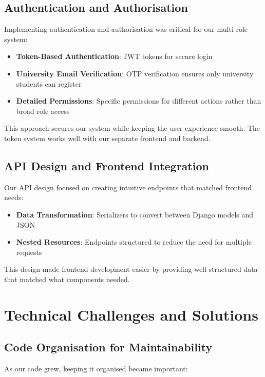 \subsection{Authentication and Authorisation}

Implementing authentication and authorisation was critical for our multi-role system:

\begin{itemize}
    \item \textbf{Token-Based Authentication}: JWT tokens for secure login
    \item \textbf{University Email Verification}: OTP verification ensures only university students can register
    \item \textbf{Detailed Permissions}: Specific permissions for different actions rather than broad role access
\end{itemize}

This approach secures our system while keeping the user experience smooth. The token system works well with our separate frontend and backend.

\subsection{API Design and Frontend Integration}

Our API design focused on creating intuitive endpoints that matched frontend needs:

\begin{itemize}
    \item \textbf{Data Transformation}: Serializers to convert between Django models and JSON
    \item \textbf{Nested Resources}: Endpoints structured to reduce the need for multiple requests
\end{itemize}

This design made frontend development easier by providing well-structured data that matched what components needed.

\section{Technical Challenges and Solutions}

\subsection{Code Organisation for Maintainability}

As our code grew, keeping it organised became important:

